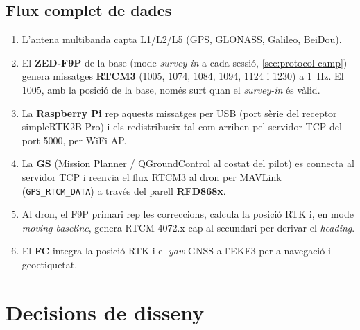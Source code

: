 \subsection{Flux complet de dades}

\begin{enumerate}[label=\arabic*.]
    \item L'antena multibanda capta L1/L2/L5 (GPS, GLONASS, Galileo, BeiDou).
    \item El \textbf{ZED-F9P} de la base (mode \emph{survey-in} a cada sessió, \cref{sec:protocol-camp}) genera missatges \textbf{RTCM3} (1005, 1074, 1084, 1094, 1124 i 1230) a 1~Hz. El 1005, amb la posició de la base, només surt quan el \emph{survey-in} és vàlid.
    \item La \textbf{Raspberry Pi} rep aquests missatges per USB (port sèrie del receptor simpleRTK2B Pro) i els redistribueix tal com arriben pel servidor TCP del port 5000, per WiFi AP.
    \item La \textbf{GS} (Mission Planner / QGroundControl al costat del pilot) es connecta al servidor TCP i reenvia el flux RTCM3 al dron per MAVLink (\texttt{GPS\_RTCM\_DATA}) a través del parell \textbf{RFD868x}.
    \item Al dron, el F9P primari rep les correccions, calcula la posició RTK i, en mode \emph{moving baseline}, genera RTCM 4072.x cap al secundari per derivar el \emph{heading}.
    \item El \textbf{FC} integra la posició RTK i el \emph{yaw} GNSS a l'EKF3 per a navegació i geoetiquetat.
\end{enumerate}

\section{Decisions de disseny}
\label{sec:decisions}

